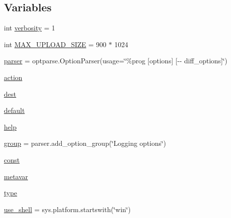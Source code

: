 \subsection*{Variables}
\begin{DoxyCompactItemize}
\item 
int \mbox{\hyperlink{namespacegoogletest-master_1_1googletest_1_1scripts_1_1upload_a03617af729988fd9568b82aa68e14352}{verbosity}} = 1
\item 
int \mbox{\hyperlink{namespacegoogletest-master_1_1googletest_1_1scripts_1_1upload_aad7dd536c8f2abc394104dabe3a34e54}{M\+A\+X\+\_\+\+U\+P\+L\+O\+A\+D\+\_\+\+S\+I\+ZE}} = 900 $\ast$ 1024
\item 
\mbox{\hyperlink{namespacegoogletest-master_1_1googletest_1_1scripts_1_1upload_adc639adf2b0f649fcad1b442cceec0b7}{parser}} = optparse.\+Option\+Parser(usage=\char`\"{}\%prog \mbox{[}options\mbox{]} \mbox{[}-\/-\/ diff\+\_\+options\mbox{]}\char`\"{})
\item 
\mbox{\hyperlink{namespacegoogletest-master_1_1googletest_1_1scripts_1_1upload_aac5337183ad153044ea3d97e6bc195a9}{action}}
\item 
\mbox{\hyperlink{namespacegoogletest-master_1_1googletest_1_1scripts_1_1upload_a302ffae92e8d65e66fc7d28a9f73f6f9}{dest}}
\item 
\mbox{\hyperlink{namespacegoogletest-master_1_1googletest_1_1scripts_1_1upload_a13594628cd38f0d0041eb83936cfa527}{default}}
\item 
\mbox{\hyperlink{namespacegoogletest-master_1_1googletest_1_1scripts_1_1upload_ad997f484682cc73db470d6fc1926ec35}{help}}
\item 
\mbox{\hyperlink{namespacegoogletest-master_1_1googletest_1_1scripts_1_1upload_ab725b951e9e38d5348cf39af5bf25603}{group}} = parser.\+add\+\_\+option\+\_\+group(\char`\"{}Logging options\char`\"{})
\item 
\mbox{\hyperlink{namespacegoogletest-master_1_1googletest_1_1scripts_1_1upload_a3979bbca87b29a0a67fc1d505c7bb2e9}{const}}
\item 
\mbox{\hyperlink{namespacegoogletest-master_1_1googletest_1_1scripts_1_1upload_a42f4cd04e1f49c0706a596e4f83f2705}{metavar}}
\item 
\mbox{\hyperlink{namespacegoogletest-master_1_1googletest_1_1scripts_1_1upload_a5ce929e2bcf8ae75c3a24d670ea07581}{type}}
\item 
\mbox{\hyperlink{namespacegoogletest-master_1_1googletest_1_1scripts_1_1upload_a528745e4e1cecb9949829c7187bf156f}{use\+\_\+shell}} = sys.\+platform.\+startswith(\char`\"{}win\char`\"{})
\end{DoxyCompactItemize}


